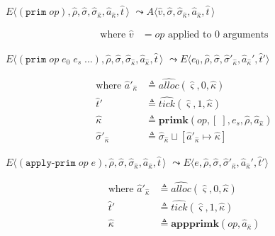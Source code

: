 \documentclass[12pt,draft]{article}
\newcommand{\primsyn}[2]{(\texttt{prim}\;#1\;#2\;...)}
\newcommand{\singleprimsyn}[1]{(\texttt{prim}\;#1)}
\newcommand{\applyprimsyn}[2]{(\texttt{apply-prim}\;#1\;#2)}
\begin{document}
{\begin{multicols*}{2}
\begin{center}
  $E\langle \singleprimsyn{op} , \hat{\rho} , \hat{\sigma} , \hat{\sigma}_{\hat{\kappa}} , \hat{a}_{\hat{\kappa}} , \hat{t}\,\rangle$
  $\leadsto A\langle \hat{v} , \hat{\sigma} , \hat{\sigma}_{\hat{\kappa}} , \hat{a}_{\hat{\kappa}} , \hat{t}\,\rangle$
\end{center}
\vspace{-7mm}
\begin{align*}
\text{where } \hat{v} &= op \text{ applied to } 0 \text{ arguments}
\end{align*}
\begin{center}
  $E\langle \primsyn{op}{e_0\;e_s} , \hat{\rho} , \hat{\sigma} , \hat{\sigma}_{\hat{\kappa}} , \hat{a}_{\hat{\kappa}} , \hat{t}\,\rangle$
  $\leadsto E\langle e_0 , \hat{\rho} , \hat{\sigma} , \hat{\sigma}'_{\hat{\kappa}} , \hat{a}_{\hat{\kappa}}' , \hat{t}'\rangle$
\end{center}
\vspace{-7mm}
\begin{align*}
  \text{where } \hat{a}'_{\hat{\kappa}} &\triangleq \widehat{alloc}(\hat{\varsigma}, 0, \hat{\kappa}) \\
  \hat{t}' &\triangleq \widehat{tick}(\hat{\varsigma}, 1, \hat{\kappa}) \\
  \hat{\kappa} &\triangleq \textbf{primk}(op, [\;], e_s, \hat{\rho}, \hat{a}_{\hat{\kappa}}) \\
  \hat{\sigma}'_{\hat{\kappa}} &\triangleq \hat{\sigma}_{\hat{\kappa}} \sqcup [\hat{a}'_{\hat{\kappa}} \mapsto \hat{\kappa}]
\end{align*}
\begin{center}
  $E\langle \applyprimsyn{op}{e} , \hat{\rho} , \hat{\sigma} , \hat{\sigma}_{\hat{\kappa}} , \hat{a}_{\hat{\kappa}} , \hat{t}\,\rangle$
  $\leadsto E\langle e , \hat{\rho} , \hat{\sigma} , \hat{\sigma}'_{\hat{\kappa}} , \hat{a}_{\hat{\kappa}}' , \hat{t}'\rangle$
\end{center}
\vspace{-7mm}
\begin{align*}
  \text{where } \hat{a}'_{\hat{\kappa}} &\triangleq \widehat{alloc}(\hat{\varsigma}, 0, \hat{\kappa}) \\
  \hat{t}' &\triangleq \widehat{tick}(\hat{\varsigma}, 1, \hat{\kappa}) \\
  \hat{\kappa} &\triangleq \textbf{appprimk}(op, \hat{a}_{\hat{\kappa}}) \\

\end{align*}
\end{multicols*}}
\end{document}
